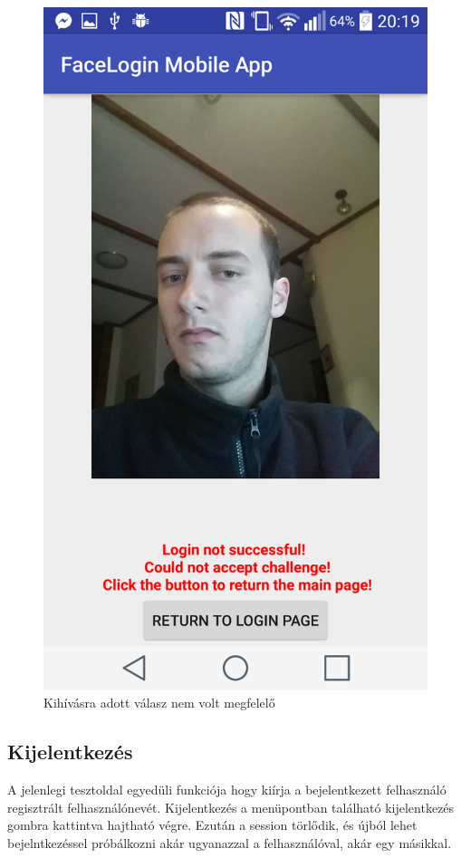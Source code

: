 \begin{figure}[h]
\begin{minipage}{.30\textwidth}
     \includegraphics[scale=0.10]{img/could_not_accept_challenge}
     \caption{Kihívásra adott válasz nem volt megfelelő}
 \end{minipage}
\end{figure}
\subsection{Kijelentkezés}
A jelenlegi tesztoldal egyedüli funkciója hogy kiírja a bejelentkezett felhasználó regisztrált felhasználónevét. Kijelentkezés a menüpontban található kijelentkezés gombra kattintva hajtható végre. Ezután a session törlődik, és újból lehet bejelntkezéssel próbálkozni akár ugyanazzal a felhasználóval, akár egy másikkal.

\newpage